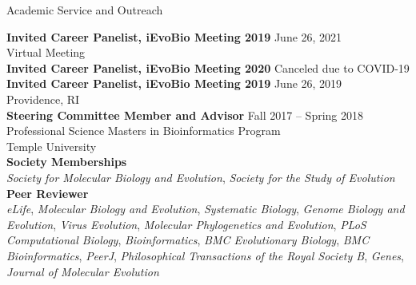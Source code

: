 \documentclass{resume} %
\begin{document}
\vspace*{0.5cm}

\vspace*{0.5cm}
\begin{rSection}{Academic Service and Outreach}
\vspace*{0.25cm}

\textbf{Invited Career Panelist, iEvoBio Meeting 2019} \hfill June 26, 2021 \\  Virtual Meeting \\

\textbf{Invited Career Panelist, iEvoBio Meeting 2020} \hfill Canceled due to COVID-19 \\ 

\textbf{Invited Career Panelist, iEvoBio Meeting 2019} \hfill June 26, 2019 \\ Providence, RI \\

\textbf{Steering Committee Member and Advisor} \hfill Fall 2017 -- Spring 2018 \\ Professional Science Masters in Bioinformatics Program \\ Temple University \\


\textbf{Society Memberships} \\  \emph{Society for Molecular Biology and Evolution}, \emph{Society for the Study of Evolution} \\


\textbf{Peer Reviewer} \\ \emph{eLife}, \emph{Molecular Biology and Evolution}, \emph{Systematic Biology}, \emph{Genome Biology and Evolution}, \emph{Virus Evolution}, \emph{Molecular Phylogenetics and Evolution}, \emph{PLoS Computational Biology}, \emph{Bioinformatics}, \emph{BMC Evolutionary Biology},  \emph{BMC Bioinformatics}, \emph{PeerJ}, \emph{Philosophical Transactions of the Royal Society B}, \emph{Genes}, \emph{Journal of Molecular Evolution}

\end{rSection}
\vspace*{0.5cm}
\end{document}
